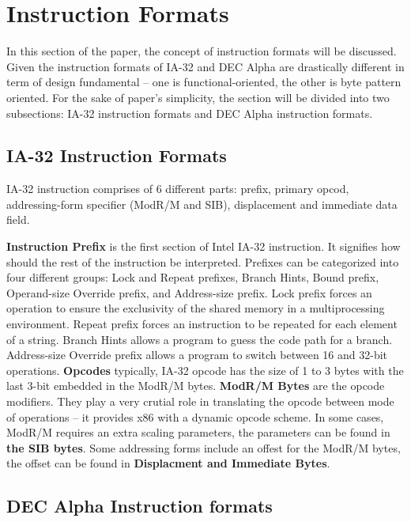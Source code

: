 \documentclass[letterpaper,10pt,titlepage]{article}
\begin{document}
\section{Instruction Formats}
In this section of the paper, the concept of instruction formats  will be
discussed. Given the instruction formats of IA-32 and DEC Alpha are drastically 
different in term of design fundamental -- one is functional-oriented, the other is
byte pattern oriented. For the sake of paper's simplicity, the section will be divided 
into two subsections: IA-32 instruction formats and DEC Alpha instruction formats. 

\subsection{IA-32 Instruction Formats}
IA-32 instruction comprises of 6 different parts: prefix, primary opcod, addressing-form
specifier (ModR/M and SIB), displacement and immediate data field. 


\textbf{Instruction Prefix} is the first section of Intel IA-32 instruction. 
It signifies how should the rest of the instruction be interpreted. Prefixes can be 
categorized into four different groups: Lock and Repeat prefixes, Branch Hints, Bound
prefix, Operand-size Override prefix, and Address-size prefix. Lock prefix 
forces an operation to ensure the exclusivity of the shared memory in a multiprocessing 
environment. Repeat prefix forces an instruction to be repeated for each element
of a string. Branch Hints allows a program to guess the code path for a branch.
Address-size Override prefix allows a program to switch between 16 and 32-bit 
operations. \textbf{Opcodes} typically, IA-32 opcode has the size of 1 to 3 bytes with
the last 3-bit embedded in the ModR/M bytes. \textbf{ModR/M Bytes} are the 
opcode modifiers. They play a very crutial role in translating the opcode between mode
of operations -- it provides x86 with a dynamic opcode scheme. In some cases, ModR/M
requires an extra scaling parameters, the parameters can be found in \textbf{the SIB 
bytes}. Some addressing forms include an offest for the ModR/M bytes, the offset can be 
found in \textbf{Displacment and Immediate Bytes}. 


\subsection{DEC Alpha Instruction formats}
\end{document}
